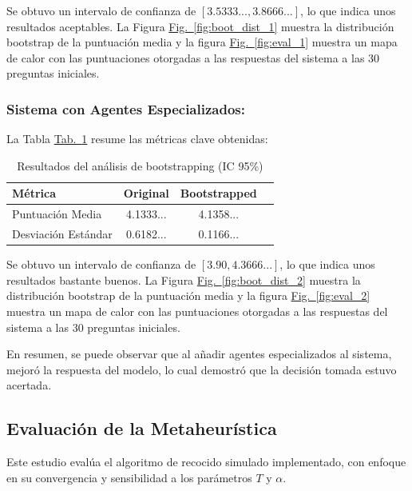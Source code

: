 \documentclass[10pt]{llncs}
\newcommand{\figref}[1]{\hyperref[#1]{Fig.~\ref*{#1}}}
\newcommand{\tabref}[1]{\hyperref[#1]{Tab.~\ref*{#1}}}
\begin{document}
\begin{remark}
Se obtuvo un intervalo de confianza de $[3.5333..., 3.8666...]$, lo que indica unos resultados aceptables. 
La Figura {\figref{fig:boot_dist_1}} muestra la distribución bootstrap de la puntuación media y la figura
{\figref{fig:eval_1}} muestra un mapa de calor con las puntuaciones otorgadas a las respuestas del sistema a las 
30 preguntas iniciales.
\end{remark}

\subsubsection{Sistema con Agentes Especializados:}

La Tabla \tabref{tab:boot_results_2} resume las métricas clave obtenidas:

\begin{table}[h]
\centering
\caption{Resultados del análisis de bootstrapping (IC 95\%)}
\label{tab:boot_results_2}
\begin{tabular}{lccc}
\hline
\textbf{Métrica} & \textbf{Original} & \textbf{Bootstrapped}  \\
\hline 
Puntuación Media& 4.1333... & 4.1358...  \\
Desviación Estándar & 0.6182... & 0.1166...  \\
\hline
\end{tabular}
\end{table}

\begin{remark}
Se obtuvo un intervalo de confianza de $[3.90,4.3666...]$, lo que indica unos resultados bastante buenos. 
La Figura {\figref{fig:boot_dist_2}} muestra la distribución bootstrap de la puntuación media y la figura 
{\figref{fig:eval_2}} muestra un mapa de calor con las puntuaciones otorgadas a las respuestas del sistema a las 
30 preguntas iniciales.
\end{remark}

En resumen, se puede observar que al añadir agentes especializados al sistema, mejoró la respuesta del modelo, lo cual demostró 
que la decisión tomada estuvo acertada.

\vspace{\baselineskip}
\subsection{Evaluación de la Metaheurística}

Este estudio evalúa el algoritmo de recocido simulado implementado, con enfoque en su convergencia y sensibilidad a los parámetros $T$ y $\alpha$.
\end{document}
